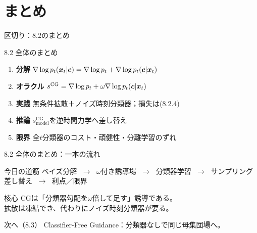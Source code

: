 \section{まとめ}
\asmain
\begin{frame}{区切り：8.2のまとめ}
    \tableofcontents[currentsection]
\end{frame}
\asmain
\begin{frame}{8.2 全体のまとめ}
    \begin{enumerate}
        \item \textbf{分解}
        $\nabla\log p_t(\bm{x}_t|\bm{c})=\nabla\log p_t+\nabla\log p_t(\bm{c}|\bm{x}_t)$
        \item \textbf{オラクル}
        $s^{\mathrm{CG}}=\nabla\log p_t+\omega\nabla\log p_t(\bm{c}|\bm{x}_t)$
        \item \textbf{実践}
        無条件拡散＋ノイズ時刻分類器；損失は(8.2.4)
        \item \textbf{推論}
        $s^{\mathrm{CG}}_{\mathrm{model}}$を逆時間力学へ差し替え
        \item \textbf{限界}
        全$t$分類器のコスト・頑健性・分離学習のずれ
    \end{enumerate}
\end{frame}
\asmain
\begin{frame}{8.2 全体のまとめ：一本の流れ}
    \begin{block}{今日の道筋}
        ベイズ分解
        $\;\to\;$
        $\omega$付き誘導場
        $\;\to\;$
        分類器学習
        $\;\to\;$
        サンプリング差し替え
        $\;\to\;$
        利点／限界
    \end{block}
    \begin{block}{核心}
        CGは「分類器勾配を$\omega$倍して足す」誘導である。\\
        拡散は凍結でき、代わりにノイズ時刻分類器が要る。
    \end{block}
    \begin{block}{次へ（8.3）}
        Classifier-Free Guidance：分類器なしで同じ母集団場へ。
    \end{block}
\end{frame}
